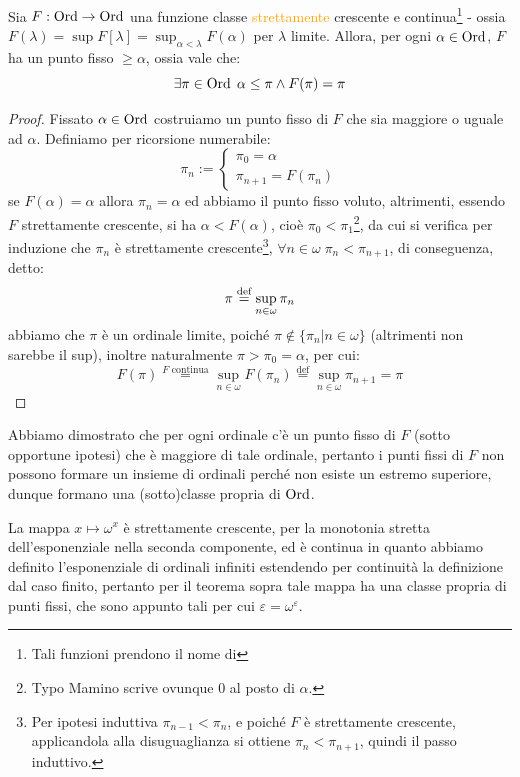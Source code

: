 \begin{proposition}
	Sia $F : \operatorname{Ord} \rightarrow \operatorname{Ord}$ una funzione classe \textcolor{orange}{strettamente} crescente e continua\footnote{Tali funzioni prendono il nome di } - ossia $F(\lambda) = \sup F[\lambda] = \sup_{\alpha < \lambda} F(\alpha)$ per $\lambda$ limite.
	Allora, per ogni $\alpha \in \operatorname{Ord}$, $F$ ha un punto fisso $\geq \alpha$, ossia vale che:
	\[ \exists \pi \in \operatorname{Ord} \; \alpha \leq \pi \land F(\pi) = \pi
		\]
\end{proposition}

\begin{proof}
	Fissato $\alpha \in \operatorname{Ord}$ costruiamo un punto fisso di $F$ che sia maggiore o uguale ad $\alpha$. Definiamo per ricorsione numerabile:
	\[ \pi_n := \begin{cases}
		\pi_0 = \alpha \\
		\pi_{n+1} = F(\pi_n)
	\end{cases}
		\]
	se $F(\alpha) = \alpha$ allora $\pi_n = \alpha$ ed abbiamo il punto fisso voluto, altrimenti, essendo $F$ strettamente crescente, si ha $\alpha < F(\alpha)$, cio\`e $\pi_0 < \pi_1$\footnote{Typo Mamino scrive ovunque 0 al posto di $\alpha$.}, da cui si verifica per induzione che $\pi_n$ \`e
	strettamente crescente\footnote{Per ipotesi induttiva $\pi_{n-1} < \pi_n$, e poich\'e $F$ \`e strettamente crescente, applicandola alla disuguaglianza si ottiene $\pi_n < \pi_{n+1}$, quindi il passo induttivo.}, $\forall n \in \omega \; \pi_n < \pi_{n+1}$, di conseguenza, detto:
	\[ \pi \overset{\text{def}}{=} \sup_{n \in \omega} \pi_n
		\]
	abbiamo che $\pi$ \`e un ordinale limite, poich\'e $\pi \not \in \{\pi_n | n \in \omega\}$ (altrimenti non sarebbe il sup), inoltre naturalmente $\pi > \pi_0 = \alpha$, per cui:
	\[ F(\pi) \overset{\text{$F$ continua}}{=} \sup_{n \in \omega} F(\pi_n) \overset{\text{def}}{=} \sup_{n \in \omega} \pi_{n+1} = \pi
		\]
\end{proof}

\begin{remark}
	Abbiamo dimostrato che per ogni ordinale c'\`e un punto fisso di $F$ (sotto opportune ipotesi) che \`e maggiore di tale ordinale, pertanto i punti fissi di $F$ non possono formare un insieme di ordinali perch\'e non esiste un estremo superiore,
	dunque formano una (sotto)classe propria di $\operatorname{Ord}$.
\end{remark}

\begin{example}
	La mappa $x \mapsto \omega^x$ \`e strettamente crescente, per la monotonia stretta dell'esponenziale nella seconda componente, ed \`e continua in quanto abbiamo definito l'esponenziale di ordinali infiniti estendendo per continuit\`a la definizione dal caso finito,
	pertanto per il teorema sopra tale mappa ha una classe propria di punti fissi, che sono appunto tali per cui $\varepsilon = \omega^{\varepsilon}$.
\end{example}

